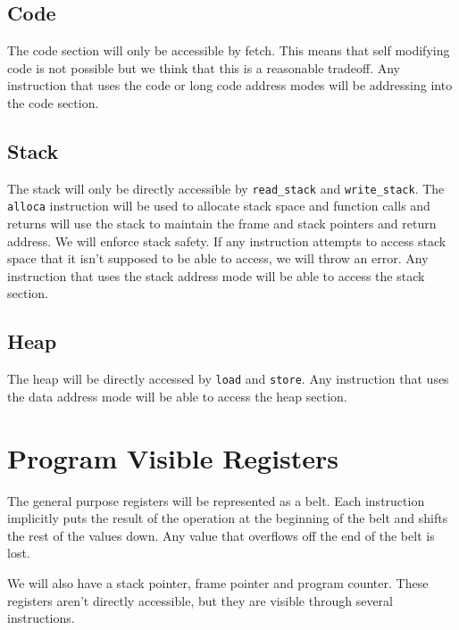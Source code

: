 \documentclass{article}
\begin{document}
	\subsection*{Code}

		The code section will only be accessible by fetch.
		This means that self modifying code is not possible but we think that this is a reasonable tradeoff.
		Any instruction that uses the code or long code address modes will be addressing into the code section.

	\subsection*{Stack}

		The stack will only be directly accessible by \texttt{read\_stack} and \texttt{write\_stack}.
		The \texttt{alloca} instruction will be used to allocate stack space and function calls and returns will use the stack to maintain the frame and stack pointers and return address.
		We will enforce stack safety. If any instruction attempts to access stack space that it isn't supposed to be able to access, we will throw an error.
		Any instruction that uses the stack address mode will be able to access the stack section.

	\subsection*{Heap}

		The heap will be directly accessed by \texttt{load} and \texttt{store}.
		Any instruction that uses the data address mode will be able to access the heap section.

\section{Program Visible Registers}

	The general purpose registers will be represented as a belt.
	Each instruction implicitly puts the result of the operation at the beginning of the belt and shifts the rest of the values down.
	Any value that overflows off the end of the belt is lost.

	We will also have a stack pointer, frame pointer and program counter.
	These registers aren't directly accessible, but they are visible through several instructions.
\end{document}

